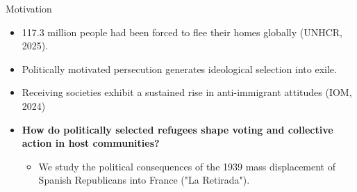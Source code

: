 \documentclass[aspectratio=169]{beamer}
\begin{document}
\begin{frame}{Motivation}

\begin{itemize}

  \item 117.3 million people had been forced to flee their homes globally (UNHCR, 2025).
  \item Politically motivated persecution generates ideological selection into exile.
  \item Receiving societies exhibit a sustained rise in anti-immigrant attitudes (IOM, 2024)
\vspace{0.4cm}
  \item \textbf{How do politically selected refugees shape voting and collective action in host communities?}
\begin{itemize}
\item We study the political consequences of the 1939 mass displacement of Spanish Republicans into France ("La Retirada").
\end{itemize}
\end{itemize}





\end{frame}
\end{document}
